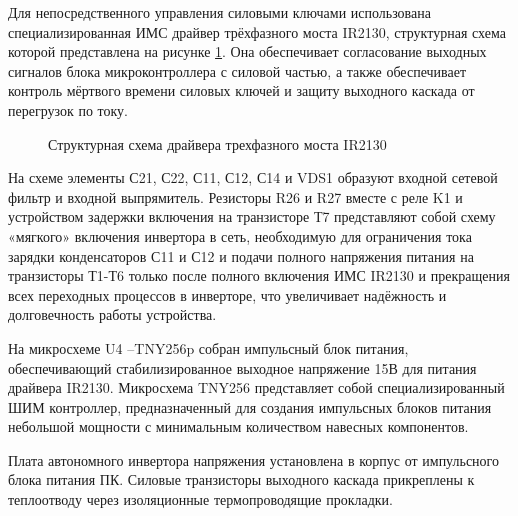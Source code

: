         Для непосредственного управления силовыми ключами использована
        специализированная ИМС драйвер трёхфазного моста IR2130, структурная
        схема которой представлена на рисунке \ref{fig:ir2130}. Она
        обеспечивает согласование выходных сигналов блока микроконтроллера с
        силовой частью, а также обеспечивает контроль мёртвого времени силовых
        ключей и защиту выходного каскада от перегрузок по току.

        \begin{figure}[h!]
            \caption{Структурная схема драйвера трехфазного моста IR2130}
            \label{fig:ir2130}
        \end{figure}

        На схеме элементы С21, С22, С11, С12, С14 и VDS1 образуют входной
        сетевой фильтр и входной выпрямитель. Резисторы  R26 и R27 вместе с
        реле K1 и устройством задержки включения на транзисторе Т7 представляют
        собой схему «мягкого» включения инвертора в сеть, необходимую для
        ограничения тока зарядки конденсаторов С11 и С12 и подачи полного
        напряжения питания на транзисторы Т1-Т6 только после полного включения
        ИМС IR2130 и прекращения всех переходных процессов в инверторе, что
        увеличивает надёжность и долговечность работы устройства. 
        
        На микросхеме U4 –TNY256p собран импульсный блок питания,
        обеспечивающий стабилизированное выходное напряжение 15В для питания
        драйвера IR2130.  Микросхема TNY256 представляет собой
        специализированный ШИМ контроллер, предназначенный для создания
        импульсных блоков питания небольшой мощности с минимальным количеством
        навесных компонентов.
        
        Плата автономного инвертора напряжения установлена в корпус от
        импульсного блока питания ПК. Силовые транзисторы выходного каскада
        прикреплены к теплоотводу через изоляционные термопроводящие прокладки.
